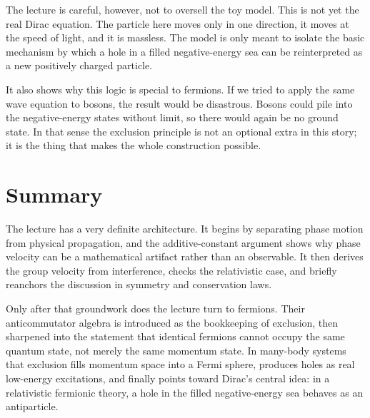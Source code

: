 The lecture is careful, however, not to oversell the toy model. This is not yet the real Dirac equation. The particle here moves only in one direction, it moves at the speed of light, and it is massless. The model is only meant to isolate the basic mechanism by which a hole in a filled negative-energy sea can be reinterpreted as a new positively charged particle.

It also shows why this logic is special to fermions. If we tried to apply the same wave equation to bosons, the result would be disastrous. Bosons could pile into the negative-energy states without limit, so there would again be no ground state. In that sense the exclusion principle is not an optional extra in this story; it is the thing that makes the whole construction possible.

\section{Summary}

The lecture has a very definite architecture. It begins by separating phase motion from physical propagation, and the additive-constant argument shows why phase velocity can be a mathematical artifact rather than an observable. It then derives the group velocity from interference, checks the relativistic case, and briefly reanchors the discussion in symmetry and conservation laws.

Only after that groundwork does the lecture turn to fermions. Their anticommutator algebra is introduced as the bookkeeping of exclusion, then sharpened into the statement that identical fermions cannot occupy the same quantum state, not merely the same momentum state. In many-body systems that exclusion fills momentum space into a Fermi sphere, produces holes as real low-energy excitations, and finally points toward Dirac's central idea: in a relativistic fermionic theory, a hole in the filled negative-energy sea behaves as an antiparticle.